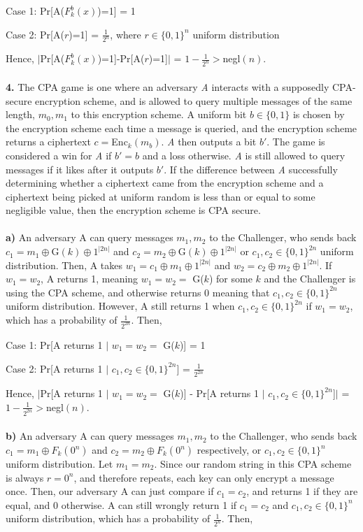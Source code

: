 \documentclass[12pt]{article}
\begin{document}
Case 1: Pr[A($F_{k}^{b}(x)$)=1] = 1

Case 2: Pr[A($r$)=1] = $\frac{1}{2^n}$, where $r \in \{0,1\}^n$ uniform distribution

\noindent Hence, $|$Pr[A($F_{k}^{b}(x)$)=1]-Pr[A($r$)=1]$|$ = $1-\frac{1}{2^n} > $negl$(n)$.
\\
\\
\noindent \textbf{4.} The CPA game is one where an adversary \emph{A} interacts with a supposedly CPA-secure encryption scheme, and is allowed to query multiple messages of the same length, $m_0, m_1$ to this encryption scheme. A uniform bit $b\in \{0,1\}$ is chosen by the encryption scheme each time a message is queried, and the encryption scheme returns a ciphertext $c = $Enc$_k(m_b)$. \emph{A} then outputs a bit $b'$. The game is considered a win for \emph{A} if $b' = b$ and a loss otherwise. \emph{A} is still allowed to query messages if it likes after it outputs $b'$. If the difference between \emph{A} successfully determining whether a ciphertext came from the encryption scheme and a ciphertext being picked at uniform random is less than or equal to some negligible value, then the encryption scheme is CPA secure.
\\
\\
\noindent \textbf{a)} An adversary A can query messages $m_1, m_2$ to the Challenger, who sends back $c_1 = m_1 \oplus $G$(k) \oplus 1^{|2n|}$ and $c_2 = m_2 \oplus $G$(k) \oplus 1^{|2n|}$ or $c_1,c_2 \in \{0,1\}^{2n}$ uniform distribution. Then, A takes $w_1 = c_1 \oplus m_1 \oplus 1^{|2n|}$ and $w_2 = c_2 \oplus m_2 \oplus 1^{|2n|}$. If $w_1 = w_2$, A returns 1, meaning $w_1 = w_2 =$ G($k$) for some $k$ and the Challenger is using the CPA scheme, and otherwise returns 0 meaning that $c_1,c_2 \in \{0,1\}^{2n}$ uniform distribution. However, A still returns 1 when $c_1,c_2 \in \{0,1\}^{2n}$ if $w_1 = w_2$, which has a probability of $\frac{1}{2^{2n}}$. Then,

Case 1: Pr[A returns 1 $|$ $w_1 = w_2 =$ G($k$)] = 1

Case 2: Pr[A returns 1 $|$ $c_1,c_2 \in \{0,1\}^{2n}$] = $\frac{1}{2^{2n}}$

\noindent Hence, $|$Pr[A returns 1 $|$ $w_1 = w_2 =$ G($k$)] - Pr[A returns 1 $|$ $c_1,c_2 \in \{0,1\}^{2n}$]$|$ = $1-\frac{1}{2^{2n}} > $negl$(n)$.
\\
\\
\noindent \textbf{b)} An adversary A can query messages $m_1, m_2$ to the Challenger, who sends back $c_1 = m_1 \oplus F_{k}(0^n)$ and $c_2 = m_2 \oplus F_{k}(0^n)$ respectively, or $c_1,c_2 \in \{0,1\}^{n}$ uniform distribution. Let $m_1 = m_2$. Since our random string in this CPA scheme is always $r = 0^n$, and therefore repeats, each key can only encrypt a message once. Then, our adversary A can just compare if $c_1 = c_2$, and returns 1 if they are equal, and 0 otherwise. A can still wrongly return 1 if $c_1 = c_2$ and $c_1,c_2 \in \{0,1\}^{n}$ uniform distribution, which has a probability of $\frac{1}{2^{n}}$. Then, 
\end{document}
